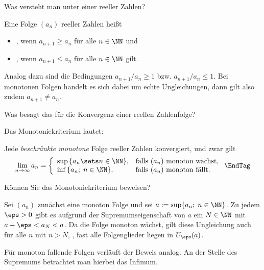 \begin{frage}%
  \label{02_fmo}
  Was versteht man unter einer  reeller Zahlen?
\end{frage}

\begin{antwort}
  Eine Folge $(a_n)$ reeller Zahlen heißt 
  \begin{itemize}[2mm]
  \item[\desc{i}] , wenn $a_{n+1} \ge a_n $ 
    für alle $n\in\NN$ und 
  \item[\desc{ii}] , wenn $a_{n+1} \le a_n $ 
    für alle $n\in\NN$ gilt.
  \end{itemize} 

  \noindent 
  Analog dazu sind die Bedingungen 
  $a_{n+1}/a_n \ge 1$ bzw. $a_{n+1}/a_n \le 1$.  
  Bei  monotonen Folgen handelt es sich dabei um echte 
  Ungleichungen, dann gilt also zudem $a_{n+1} \not= a_n$.
  \AntEnd
\end{antwort}

\begin{frage}%
  \label{02_mokr}
  Was besagt das  für die Konvergenz einer 
  reellen Zahlenfolge?
\end{frage}

\begin{antwort}
  Das Monotoniekriterium lautet: 

  \medskip\noindent
  Jede 
  \emph{beschränkte monotone} 
  Folge reeller Zahlen konvergiert, und zwar 
  gilt 
  \[
  \lim_{n\to\infty} a_n = \left\{ \begin{array}{ll} 
      \sup\, \{a_n\sets n\in \NN\}, & \text{falls $(a_n)$ monoton 
        wächst,} \\
      \inf\, \{a_n;\; n\in \NN\}, &\text{falls $(a_n)$ monoton fällt.} 
    \end{array}\right. \EndTag
  \]
\end{antwort}

\begin{frage}%
  \label{02_mokb}
  Können Sie das Monotoniekriterium beweisen?
\end{frage}

\begin{antwort}
  Sei $(a_n)$ zunächst eine monoton  Folge und sei 
  $a:=\sup\{ a_n;\; n\in\NN \}$. Zu jedem $\eps>0$ gibt es aufgrund der 
  Supremumseigenschaft von $a$ ein $N\in\NN$ mit $a-\eps < a_N<a$. Da die Folge 
  monoton wächst, gilt diese Ungleichung auch für alle $n$ mit $n > N$, 
  {\dasheisst}, fast alle Folgenglieder liegen in $U_\eps (a)$.

  Für monoton fallende Folgen verläuft der Beweis analog. An der Stelle des 
  Supremums betrachtet man hierbei das Infimum.
  \AntEnd
\end{antwort}

